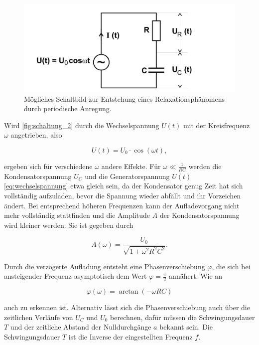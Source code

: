 \begin{figure}
    \centering
    \includegraphics[width=\textwidth/2]{images/schaltung_2.png}
    \caption{Mögliches Schaltbild zur Entstehung eines Relaxationsphänomens durch periodische Anregung.  \cite{V353}}
    \label{fig:schaltung_2}
\end{figure}

Wird \autoref{fig:schaltung_2} durch die Wechselspannung $U (t)$ mit der Kreisfrequenz $\omega$ angetrieben, also 

\begin{equation}
    \label{eq:wechselspannung}
    U (t) = U_0 \cdot \cos \left(\omega t \right),
\end{equation}

ergeben sich für verschiedene $\omega$ andere Effekte. Für $\omega \ll \frac{1}{RC}$ werden die Kondensatorspannung $U_C$ und die Generatorspannung $U (t)$ \autoref{eq:wechselspannung} etwa gleich sein, da der Kondensator genug Zeit hat sich vollständig aufzuladen, bevor die Spannung wieder abfällt und ihr Vorzeichen ändert. Bei entsprechend höheren Frequenzen kann der Aufladevorgang nicht mehr vollständig stattfinden und die Amplitude $A$ der Kondensatorspannung wird kleiner werden. Sie ist gegeben durch

\begin{equation}
    \label{eq:amplitude}
    A (\omega) = \frac{U_0}{\sqrt{1 + \omega^2 R^2 C^2}}.
\end{equation}

Durch die verzögerte Aufladung entsteht eine Phasenverschiebung $\varphi$, die sich bei ansteigender Frequenz asymptotisch dem Wert $\varphi = \frac{\pi}{2}$ annähert. Wie an

\begin{equation}
    \label{eq:phasenverschiebung}
    \varphi (\omega) = \arctan \left(-\omega R C \right)
\end{equation}

auch zu erkennen ist. Alternativ lässt sich die Phasenverschiebung auch über die zeitlichen Verläufe von $U_C$ und $U_0$ berechnen, dafür müssen die Schwingungsdauer $T$ und der zeitliche Abstand der Nulldurchgänge $a$ bekannt sein. Die Schwingungsdauer $T$ ist die Inverse der eingestellten Frequenz $f$.

